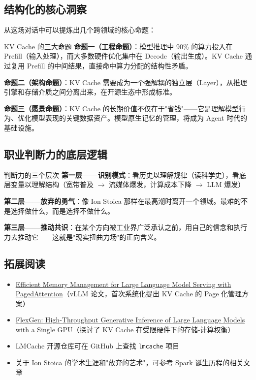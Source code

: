 \documentclass[a4paper]{article}
\begin{document}
\subsection{结构化的核心洞察}

从这场对话中可以提炼出几个跨领域的核心命题：

\begin{importantbox}{KV Cache 的三大命题}
\textbf{命题一（工程命题）}：模型推理中 90\% 的算力投入在 Prefill（输入处理），而大多数硬件优化集中在 Decode（输出生成）。KV Cache 通过复用 Prefill 的中间结果，直接命中算力分配的结构性矛盾。

\textbf{命题二（架构命题）}：KV Cache 需要成为一个强解耦的独立层（Layer），从推理引擎和存储介质之间分离出来，在开源生态中形成标准。

\textbf{命题三（愿景命题）}：KV Cache 的长期价值不仅在于"省钱"——它是理解模型行为、优化模型表现的关键数据资产。模型原生记忆的管理，将成为 Agent 时代的基础设施。
\end{importantbox}

\subsection{职业判断力的底层逻辑}

\begin{importantbox}{判断力的三个层次}
\textbf{第一层——识别模式}：看历史以理解规律（读科学史），看底层变量以理解结构（宽带普及 $\rightarrow$ 流媒体爆发，计算成本下降 $\rightarrow$ LLM 爆发）

\textbf{第二层——放弃的勇气}：像 Ion Stoica 那样在最高潮时离开一个领域。最难的不是选择做什么，而是选择不做什么。

\textbf{第三层——推动共识}：在某个方向被工业界广泛承认之前，用自己的信念和执行力去推动它——这就是"现实扭曲力场"的正向含义。
\end{importantbox}

\subsection{拓展阅读}

\begin{itemize}
\item \href{https://arxiv.org/abs/2309.06180}{Efficient Memory Management for Large Language Model Serving with PagedAttention}（vLLM 论文，首次系统化提出 KV Cache 的 Page 化管理方案）
\item \href{https://arxiv.org/abs/2303.06865}{FlexGen: High-Throughput Generative Inference of Large Language Models with a Single GPU}（探讨了 KV Cache 在受限硬件下的存储-计算权衡）
\item LMCache 开源仓库可在 GitHub 上查找 \texttt{lmcache} 项目
\item 关于 Ion Stoica 的学术生涯和"放弃的艺术"，可参考 Spark 诞生历程的相关文章
\end{itemize}
\end{document}
